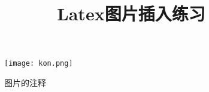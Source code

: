 \documentclass[UTF8]{article}
\title{Latex图片插入练习}
\begin{document}
\maketitle


\begin{figure}[h]
    \centering
    \texttt{[image: kon.png]}
    \caption{图片的注释} 
\end{figure}
\end{document}
